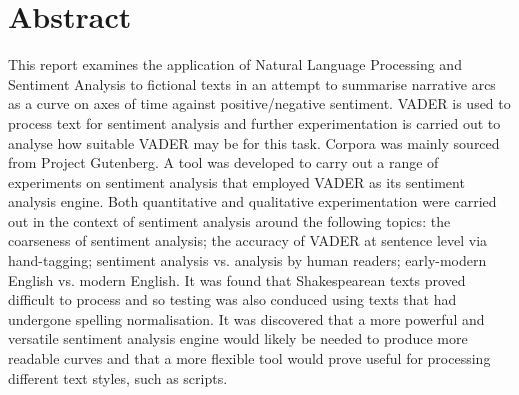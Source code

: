\documentclass{article}
\begin{document}
\section*{Abstract}
    This report examines the application of Natural Language Processing and Sentiment Analysis to fictional texts in an attempt to summarise narrative arcs as a curve on axes of time against positive/negative sentiment. VADER is used to process text for sentiment analysis and further experimentation is carried out to analyse how suitable VADER may be for this task. Corpora was mainly sourced from Project Gutenberg. A tool was developed to carry out a range of experiments on sentiment analysis that employed VADER as its sentiment analysis engine. Both quantitative and qualitative experimentation were carried out in the context of sentiment analysis around the following topics: the coarseness of sentiment analysis; the accuracy of VADER at sentence level via hand-tagging; sentiment analysis vs. analysis by human readers; early-modern English vs. modern English. It was found that Shakespearean texts proved difficult to process and so testing was also conduced using texts that had undergone spelling normalisation. It was discovered that a more powerful and versatile sentiment analysis engine would likely be needed to produce more readable curves and that a more flexible tool would prove useful for processing different text styles, such as scripts.
    \newline
    \newline
\end{document}
